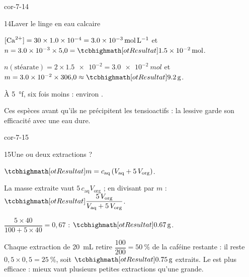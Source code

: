 \begin{blocLivre}{cor-7-14}
\begin{corrige}{14}{Laver le linge en eau calcaire}
\begin{questions}
\item $[\ce{Ca^{2+}}]=30\times\num{1.0e-4}=\qty{3,0e-3}{mol.L^{-1}}$ et $n=\num{3.0e-3}\times5{,}0=\res{\qty{1,5e-2}{mol}}$.
\item $n(\text{stéarate})=2\times\num{1.5e-2}=\qty{3,0e-2}{mol}$ et $m=\num{3.0e-2}\times306{,}0\approx\res{\qty{9,2}{g}}$.
\item À \num{5}~°f, six fois moins : environ .
\item Ces espèces  avant qu'ils ne précipitent les tensioactifs : la lessive garde son efficacité
avec une eau dure.
\end{questions}
\end{corrige}
\end{blocLivre}
\begin{blocLivre}{cor-7-15}
\begin{corrige}{15}{Une ou deux extractions ?}
\begin{questions}
\item $\res{m=c_\text{aq}\,(V_\text{aq}+5\,V_\text{org})}$.
\item La masse extraite vaut $5\,c_\text{aq}V_\text{org}$ ; en divisant par $m$ : $\res{\dfrac{5\,V_\text{org}}{V_\text{aq}+5\,V_\text{org}}}$.
\item $\dfrac{5\times40}{100+5\times40}=0{,}67$ : $\res{\qty{0,67}{g}}$.
\item Chaque extraction de \qty{20}{mL} retire $\dfrac{100}{200}=\qty{50}{\percent}$ de la caféine restante : il reste $0{,}5\times0{,}5=\qty{25}{\percent}$, soit
$\res{\qty{0,75}{g}}$ extraits. Le  est plus efficace : mieux vaut plusieurs petites extractions qu'une grande.
\end{questions}
\end{corrige}
\end{blocLivre}

